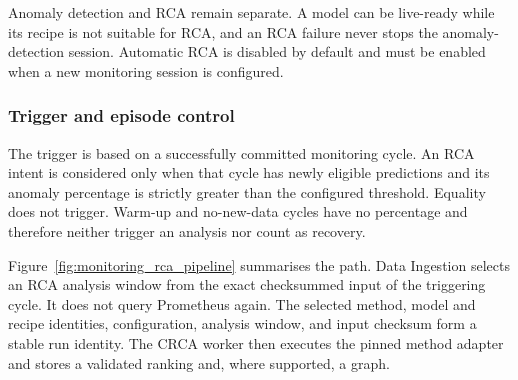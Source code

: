 Anomaly detection and RCA remain separate. A model can be live-ready while its recipe is not suitable for RCA, and an RCA failure never stops the anomaly-detection session. Automatic RCA is disabled by default and must be enabled when a new monitoring session is configured.

\subsubsection{Trigger and episode control}

The trigger is based on a successfully committed monitoring cycle. An RCA intent is considered only when that cycle has newly eligible predictions and its anomaly percentage is strictly greater than the configured threshold. Equality does not trigger. Warm-up and no-new-data cycles have no percentage and therefore neither trigger an analysis nor count as recovery.

Figure~\ref{fig:monitoring_rca_pipeline} summarises the path. Data Ingestion selects an RCA analysis window from the exact checksummed input of the triggering cycle. It does not query Prometheus again. The selected method, model and recipe identities, configuration, analysis window, and input checksum form a stable run identity. The CRCA worker then executes the pinned method adapter and stores a validated ranking and, where supported, a graph.


